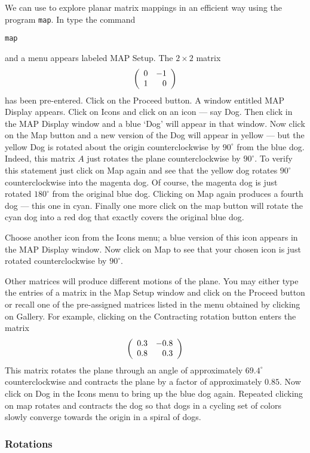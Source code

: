 \documentclass{ximera}
\begin{document}
We can use \Matlab to explore planar matrix mappings in an efficient way 
using the program {\tt map}.  In \Matlab type the command
\begin{verbatim}
map
\end{verbatim}
and a menu appears labeled {\sf MAP Setup}.  The $2\times 2$ matrix
\[
\left(\begin{array}{rr} 0 & -1\\ 1 &0\end{array}\right)
\]
has been pre-entered.  Click on the {\sf Proceed} button.  A
window entitled {\sf MAP Display} appears. Click on {\sf Icons}
and click on an icon --- say {\sf Dog}. 
Then click in the {\sf MAP Display} window and a blue `{\sf Dog}' 
will appear in that window.  Now click on
the {\sf Map} button and a new version of the {\sf Dog} will
appear in yellow --- but the yellow {\sf Dog} is rotated about
the origin counterclockwise by $90^\circ$ from the blue dog.
Indeed, this matrix $A$ just rotates the plane counterclockwise
by $90^\circ$.  To verify this statement just click on {\sf Map}
again and see that the yellow dog rotates $90^\circ$
counterclockwise into the magenta dog.  Of course, the magenta
dog is just rotated $180^\circ$ from the original blue dog.
Clicking on {\sf Map} again produces a fourth dog --- this one
in cyan.  Finally one more click on the {\sf map} button will
rotate the cyan dog into a red dog that exactly covers the
original blue dog.

Choose another icon from the {\sf Icons} menu; a blue version of
this icon appears in the {\sf MAP Display} window.  Now click on
{\sf Map} to see that your chosen icon is just rotated
counterclockwise by $90^\circ$.

Other matrices will produce different motions of the plane.  You
may either type the entries of a matrix in the {\sf Map Setup}
window and click on the {\sf Proceed} button or recall one of
the pre-assigned matrices listed in the menu obtained by
clicking on {\sf Gallery}.  For example, clicking on
the {\sf Contracting rotation} button enters the matrix
\[
\left(\begin{array}{rr} 0.3 & -0.8\\ 0.8 &0.3\end{array}\right)
\]
This matrix rotates the plane through an angle of approximately
$69.4^\circ$ counterclockwise and contracts the plane by a
factor of approximately $0.85$.  Now click on {\sf Dog} in the
{\sf Icons} menu to bring up the blue dog again.  Repeated
clicking on {\sf map} rotates and contracts the dog so that dogs
in a cycling set of colors slowly converge towards the origin in
a spiral of dogs.

\subsubsection*{Rotations}
\end{document}

